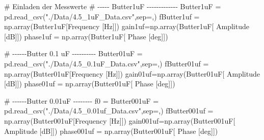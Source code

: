 \documentclass[
  ngerman,
  letterpaper,
  DIV=11]{scrreprt}
\newenvironment{Shaded}{}{}
\newcommand{\CommentTok}[1]{\textcolor[rgb]{0.42,0.45,0.49}{#1}}
\newcommand{\NormalTok}[1]{\textcolor[rgb]{0.14,0.16,0.18}{#1}}
\newcommand{\OperatorTok}[1]{\textcolor[rgb]{0.14,0.16,0.18}{#1}}
\newcommand{\StringTok}[1]{\textcolor[rgb]{0.01,0.18,0.38}{#1}}
\begin{document}
\begin{Shaded}
\begin{Highlighting}[]
\CommentTok{\# Einladen der Messwerte}
\CommentTok{\# {-}{-}{-}{-}{-} Butter1uF {-}{-}{-}{-}{-}{-}{-}{-}{-}{-}{-}{-}{-} }
\NormalTok{Butter1uF }\OperatorTok{=}\NormalTok{ pd.read\_csv(}\StringTok{"./Data/4.5\_1uF\_Data.csv"}\NormalTok{,sep}\OperatorTok{=}\StringTok{\textquotesingle{},\textquotesingle{}}\NormalTok{)}
\NormalTok{fButter1uf }\OperatorTok{=}\NormalTok{ np.array(Butter1uF[}\StringTok{\textquotesingle{}Frequency [Hz]\textquotesingle{}}\NormalTok{])}
\NormalTok{gain1uf}\OperatorTok{=}\NormalTok{np.array(Butter1uF[}\StringTok{\textquotesingle{} Amplitude [dB]\textquotesingle{}}\NormalTok{])}
\NormalTok{phase1uf }\OperatorTok{=}\NormalTok{ np.array(Butter1uF[}\StringTok{\textquotesingle{} Phase [deg]\textquotesingle{}}\NormalTok{])}

\CommentTok{\# {-}{-}{-}{-}{-}{-}Butter 0.1 uF {-}{-}{-}{-}{-}{-}{-}{-}{-}{-} }
\NormalTok{Butter01uF }\OperatorTok{=}\NormalTok{ pd.read\_csv(}\StringTok{"./Data/4.5\_0.1uF\_Data.csv"}\NormalTok{,sep}\OperatorTok{=}\StringTok{\textquotesingle{},\textquotesingle{}}\NormalTok{)}
\NormalTok{fButter01uf }\OperatorTok{=}\NormalTok{ np.array(Butter01uF[}\StringTok{\textquotesingle{}Frequency [Hz]\textquotesingle{}}\NormalTok{])}
\NormalTok{gain01uf}\OperatorTok{=}\NormalTok{np.array(Butter01uF[}\StringTok{\textquotesingle{} Amplitude [dB]\textquotesingle{}}\NormalTok{])}
\NormalTok{phase01uf }\OperatorTok{=}\NormalTok{ np.array(Butter01uF[}\StringTok{\textquotesingle{} Phase [deg]\textquotesingle{}}\NormalTok{])}

\CommentTok{\# {-}{-}{-}{-}{-}{-}Butter 0.01uF {-}{-}{-}{-}{-}{-}{-}{-} f0 = }
\NormalTok{Butter001uF }\OperatorTok{=}\NormalTok{ pd.read\_csv(}\StringTok{"./Data/4.5\_0.01uf\_Data.csv"}\NormalTok{,sep}\OperatorTok{=}\StringTok{\textquotesingle{},\textquotesingle{}}\NormalTok{)}
\NormalTok{fButter001uf }\OperatorTok{=}\NormalTok{ np.array(Butter001uF[}\StringTok{\textquotesingle{}Frequency [Hz]\textquotesingle{}}\NormalTok{])}
\NormalTok{gain001uf}\OperatorTok{=}\NormalTok{np.array(Butter001uF[}\StringTok{\textquotesingle{} Amplitude [dB]\textquotesingle{}}\NormalTok{])}
\NormalTok{phase001uf }\OperatorTok{=}\NormalTok{ np.array(Butter001uF[}\StringTok{\textquotesingle{} Phase [deg]\textquotesingle{}}\NormalTok{])}
\end{Highlighting}
\end{Shaded}
\end{document}
